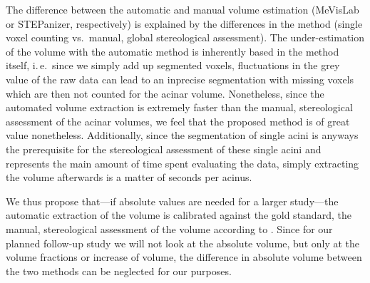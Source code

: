 \documentclass[%
	twoside,
	paper=a4,%
	abstract=true,%
	]{scrartcl}
\newcommand{\ie}{i.\,e.\ }
\begin{document}
{{The difference between the automatic and manual volume estimation (MeVisLab or STEPanizer, respectively) is explained by the differences in the method (single voxel counting vs.\ manual, global stereological assessment). The under-estimation of the volume with the automatic method is inherently based in the method itself, \ie since we simply add up segmented voxels, fluctuations in the grey value of the raw data can lead to an inprecise segmentation with missing voxels which are then not counted for the acinar volume. Nonetheless, since the automated volume extraction is extremely faster than the manual, stereological assessment of the acinar volumes, we feel that the proposed method is of great value nonetheless. Additionally, since the segmentation of single acini is anyways the prerequisite for the stereological assessment of these single acini and represents the main amount of time spent evaluating the data, simply extracting the volume afterwards is a matter of seconds per acinus.

We thus propose that---if absolute values are needed for a larger study---the automatic extraction of the volume is calibrated against the gold standard, the manual, stereological assessment of the volume according to \citet{Hsia2010}. Since for our planned follow-up study we will not look at the absolute volume, but only at the volume fractions or increase of volume, the difference in absolute volume between the two methods can be neglected for our purposes.

}}
\end{document}
